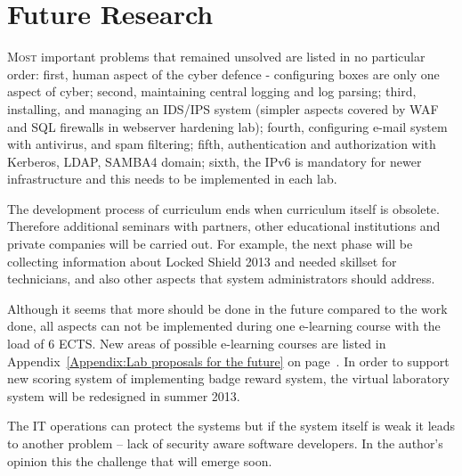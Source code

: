 \chapter{Future Research}
\label{Future Research}

\lettrine[lraise=0.1, nindent=0em, slope=-.5em]{\color{Violet}M}{ost} important problems that remained unsolved are listed in no particular order: first, human aspect of the cyber defence - configuring boxes are only one aspect of cyber; second, maintaining central logging and log parsing; third, installing, and managing an \gls{IDS}/\gls{IPS} system (simpler aspects covered by \gls{WAF} and \gls{SQL} firewalls in webserver hardening lab); fourth, configuring e-mail system with antivirus, and spam filtering; fifth, authentication and authorization with Kerberos, LDAP, SAMBA4 domain; sixth, the IPv6 is mandatory for newer infrastructure and this needs to be implemented in each lab.


The development process of curriculum ends when curriculum itself is obsolete. Therefore additional seminars with partners, other educational institutions and private companies will be carried out. For example, the next phase will be collecting information about Locked Shield 2013 and needed skillset for technicians, and also other aspects that system administrators should address.

Although it seems that more should be done in the future compared to the work done, all aspects can not be implemented during one e-learning course with the load of 6 \gls{ECTS}. New areas of possible e-learning courses are listed in Appendix~\ref{Appendix:Lab proposals for the future} on page~\pageref{Appendix:Lab proposals for the future}. In order to support new scoring system of implementing badge reward system, the virtual laboratory system will be redesigned in summer 2013.


The IT operations can protect the systems but if the system itself is weak it leads to another problem -- lack of security aware software developers. In the author’s opinion this the challenge that will emerge soon.
